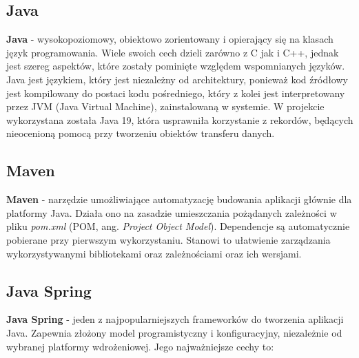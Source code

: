 \documentclass[11pt,a4paper]{article}
\begin{document}
\subsection{Java}
\textbf{Java} \cite{java} - wysokopoziomowy, obiektowo zorientowany i opierający się na klasach język programowania. Wiele swoich cech dzieli zarówno z C jak i C++, jednak jest szereg aspektów, które zostały pominięte względem wspomnianych języków. Java jest językiem, który jest niezależny od architektury, ponieważ kod źródłowy jest kompilowany do postaci kodu pośredniego, który z kolei jest interpretowany przez JVM (Java Virtual Machine), zainstalowaną w systemie. W projekcie wykorzystana została Java 19, która usprawniła korzystanie z rekordów, będących nieocenioną pomocą przy tworzeniu obiektów transferu danych.

\subsection{Maven}
\textbf{Maven} \cite{maven} - narzędzie umożliwiające automatyzację budowania aplikacji głównie dla platformy Java. Działa ono na zasadzie umieszczania pożądanych zależności w pliku \textsl{pom.xml} (POM, ang. \textsl{Project Object Model}). Dependencje są automatycznie pobierane przy pierwszym wykorzystaniu. Stanowi to ułatwienie zarządzania wykorzystywanymi bibliotekami oraz zależnościami oraz ich wersjami.

\subsection{Java Spring}
\textbf{Java Spring} \cite{spring} - jeden z najpopularniejszych frameworków do tworzenia aplikacji Java.
Zapewnia złożony model programistyczny i konfiguracyjny, niezależnie od wybranej platformy wdrożeniowej. Jego najważniejsze cechy to:
\end{document}
